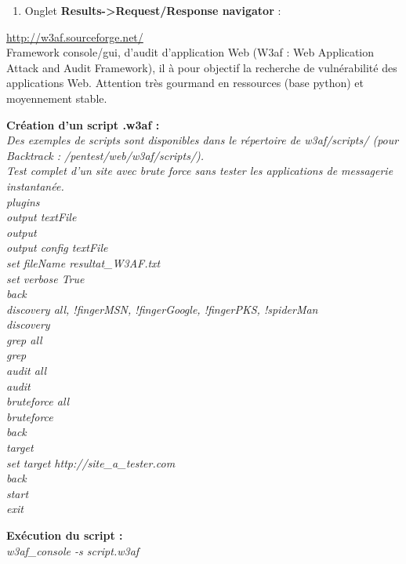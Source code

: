 \documentclass[a4paper,11pt]{article}				    %
\begin{document}
{\begin{enumerate}
	\item Onglet \textbf{Results->Request/Response navigator} :
\end{enumerate}
}
{
\url{http://w3af.sourceforge.net/}
}
{
\\Framework console/gui, d'audit d'application Web (W3af : Web Application Attack and Audit Framework), il \`a pour objectif la recherche de vuln\'erabilit\'e des applications Web. Attention tr\`es gourmand en ressources (base python) et moyennement stable.
}
{
	\textbf{Cr\'eation d'un script .w3af :}\\
	\textit{Des exemples de scripts sont disponibles dans le r\'epertoire de w3af/scripts/ (pour Backtrack : /pentest/web/w3af/scripts/).}\\
	\textit{Test complet d'un site avec brute force sans tester les applications de messagerie instantan\'ee.}\\
	{\sl \color{blue}
	plugins\\
	output textFile\\
	output\\
	output config textFile\\
	set fileName resultat\_W3AF.txt\\
	set verbose True\\
	back\\
	discovery all, !fingerMSN, !fingerGoogle, !fingerPKS, !spiderMan\\
	discovery\\
	grep all\\
	grep\\
	audit all\\
	audit\\
	bruteforce all\\
	bruteforce\\
	back\\
	target\\
	set target http://site\_a\_tester.com\\
	back\\
	start\\
	exit\\
	}
	
	\textbf{Ex\'ecution du script :}\\
	{\sl \color{blue}w3af\_console -s script.w3af}
}
\end{document}
